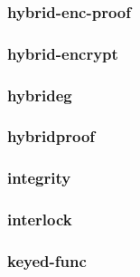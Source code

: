 \begin{frame}\frametitle{hybrid-enc-proof}
\begin{figure}
\begin{center}

\end{center}
\end{figure}
\end{frame}
\begin{frame}\frametitle{hybrid-encrypt}
\begin{figure}
\begin{center}

\end{center}
\end{figure}
\end{frame}
\begin{frame}\frametitle{hybrideg}
\begin{figure}
\begin{center}

\end{center}
\end{figure}
\end{frame}
\begin{frame}\frametitle{hybridproof}
\begin{figure}
\begin{center}

\end{center}
\end{figure}
\end{frame}
\begin{frame}\frametitle{integrity}
\begin{figure}
\begin{center}

\end{center}
\end{figure}
\end{frame}
\begin{frame}\frametitle{interlock}
\begin{figure}
\begin{center}

\end{center}
\end{figure}
\end{frame}
\begin{frame}\frametitle{keyed-func}
\begin{figure}
\begin{center}

\end{center}
\end{figure}
\end{frame}
